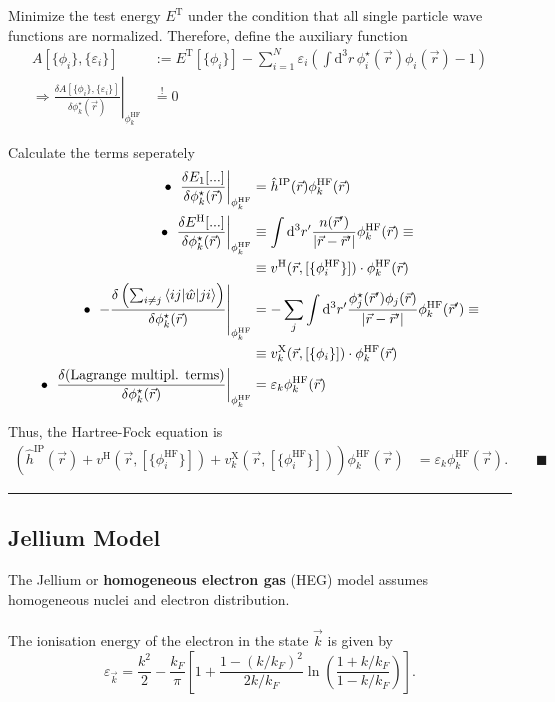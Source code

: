 \documentclass{article}
\newcommand{\diff}{\mathrm{d}}
\newcommand{\lr}[1]{\left(#1\right)}
\newcommand{\lreck}[1]{\left[#1\right]}
\begin{document}
{	Minimize the test energy $E^\text{T}$ under the condition that all single particle wave functions are normalized. Therefore, define the auxiliary function
		\begin{align*}
			A[\{\phi_i\}, \{\varepsilon_i\}] &:= E^\text{T}[\{\phi_i\}] - \sum_{i=1}^N \varepsilon_i \lr{ \int \diff^3r \, \phi_i^\star(\vec{r}) \phi_i(\vec{r}) - 1 } \\
			\Rightarrow \left. \frac{\delta A[\{\phi_i\}, \{\varepsilon_i\}]}{\delta \phi_k^\star(\vec{r})} \right|_{\phi_k^\text{HF}} &\stackrel{!}{=} 0
		\end{align*}


\newpage


	Calculate the terms seperately
		\begin{align*}
			\bullet \ \left. \frac{\delta E_1[...]}{\delta \phi_k^\star(\vec{r})} \right|_{\phi_k^\text{HF}} &= \hat{h}^\text{IP}(\vec{r}) \phi_k^\text{HF}(\vec{r}) \\
			\bullet \ \left. \frac{\delta E^\text{H}[...]}{\delta \phi_k^\star(\vec{r})} \right|_{\phi_k^\text{HF}} &\equiv \int \diff^3r' \frac{n(\vec{r}')}{|\vec{r} - \vec{r}'|} \phi_k^\text{HF}(\vec{r}) \equiv \\
			&\equiv v^\text{H}(\vec{r}, [\{\phi_i^\text{HF}\}]) \cdot \phi_k^\text{HF}(\vec{r}) \\
			\bullet \ \left. -\frac{\delta \lr{ \sum_{i\neq j} \braket{ i j | \hat{w} | j i} } }{\delta \phi_k^\star(\vec{r})} \right|_{\phi_k^\text{HF}} &= -\sum_j \int \diff^3r' \frac{ \phi_j^\star(\vec{r}') \phi_j(\vec{r}) }{|\vec{r} - \vec{r}'|} \phi_k^\text{HF}(\vec{r}') \equiv\\
			 &\equiv v_k^\text{X}(\vec{r}, [\{\phi_i\}]) \cdot \phi_k^\text{HF}(\vec{r}) \\
			\bullet \ \left. \frac{\delta (\text{Lagrange multipl. terms})}{\delta \phi_k^\star(\vec{r})} \right|_{\phi_k^\text{HF}} &= \varepsilon_k \phi_k	^\text{HF}(\vec{r})
		\end{align*}
	
	Thus, the Hartree-Fock equation is
		\begin{align*}
			\lr{ \hat{h}^\text{IP}(\vec{r}) + v^\text{H}(\vec{r}, [\{\phi_i^\text{HF}\}]) + v_k^\text{X}(\vec{r}, [\{\phi_i^\text{HF}\}]) } \phi_k^\text{HF}(\vec{r}) &= \varepsilon_k \phi_k^\text{HF}(\vec{r}). \qquad \blacksquare
		\end{align*}			
\hrule
}


\newpage


\subsection{Jellium Model} %
The Jellium or \textbf{homogeneous electron gas} (HEG) model assumes homogeneous nuclei and electron distribution.\\
\\
The ionisation energy of the electron in the state $\vec{k}$ is given by
	\begin{equation}
		\varepsilon_{\vec{k}} = \frac{k^2}{2} - \frac{k_F}{\pi} \lreck{ 1 + \frac{1 - (k/k_F)^2}{2k/k_F} \ln\lr{ \frac{1 + k/k_F}{1 - k/k_F} } }.
	\end{equation}
\end{document}
